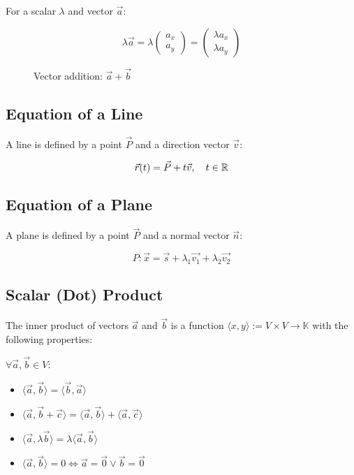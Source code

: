 For a scalar \(\lambda\) and vector \(\vec{a}\):

\[
	\lambda \vec{a} = \lambda \begin{pmatrix} a_x \\ a_y \end{pmatrix} = \begin{pmatrix} \lambda a_x \\ \lambda a_y \end{pmatrix}
\]

\begin{figure}[h!]
	\centering
	\caption{Vector addition: \(\vec{a} + \vec{b}\)}
\end{figure}

\subsection{Equation of a Line}

A line is defined by a point \(\vec{P}\) and a direction vector \(\vec{v}\):

\[
	\vec{r}(t) = \vec{P} + t\vec{v}, \quad t \in \mathbb{R}
\]

\subsection{Equation of a Plane}

A plane is defined by a point \(\vec{P}\) and a normal vector \(\vec{n}\):

\[
	P: \vec{x} = \vec{s} + \lambda_1 \vec{v_1} + \lambda_2 \vec{v_2}
\]

\subsection{Scalar (Dot) Product}

The inner product of vectors \(\vec{a}\) and \(\vec{b}\) is a function \(\langle x, y\rangle :=V \times V \rightarrow \mathbb{K}\)
with the following properties:

\(\forall \vec{a}, \vec{b} \in V\):

\begin{itemize}
	\item \(\langle\vec{a}, \vec{b}\rangle = \langle\vec{b}, \vec{a}\rangle \)
	\item \(\langle\vec{a}, \vec{b} + \vec{c}\rangle = \langle\vec{a}, \vec{b}\rangle + \langle\vec{a}, \vec{c}\rangle\)
	\item \(\langle\vec{a}, \lambda \vec{b}\rangle = \lambda \langle\vec{a}, \vec{b}\rangle\)
	\item \(\langle\vec{a}, \vec{b}\rangle = 0 \Leftrightarrow \vec{a} = \vec{0} \vee \vec{b} = \vec{0}\)
\end{itemize}


